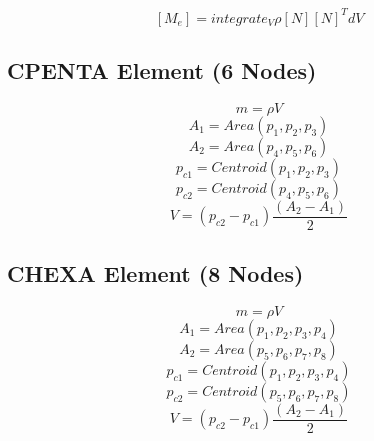       \[ [M_e] = integrate_V{\rho [N][N]^T dV} \]

   \subsection{CPENTA Element (6 Nodes)}
     \[ m = \rho V \]
     \[ A_1 = Area(p_1, p_2, p_3) \]
     \[ A_2 = Area(p_4, p_5, p_6) \]
     \[ p_{c1} = Centroid(p_1, p_2 ,p_3) \]
     \[ p_{c2} = Centroid(p_4, p_5 ,p_6) \]
     \[ V = (p_{c2}-p_{c1}) \frac{(A_2 - A_1)}{2} \]

   \subsection{CHEXA Element (8 Nodes)}
     \[ m = \rho V \]
     \[ A_1 = Area(p_1, p_2, p_3, p_4) \]
     \[ A_2 = Area(p_5, p_6, p_7, p_8) \]
     \[ p_{c1} = Centroid(p_1, p_2 ,p_3, p_4) \]
     \[ p_{c2} = Centroid(p_5, p_6 ,p_7, p_8) \]
     \[ V = (p_{c2}-p_{c1}) \frac{(A_2 - A_1)}{2} \]

